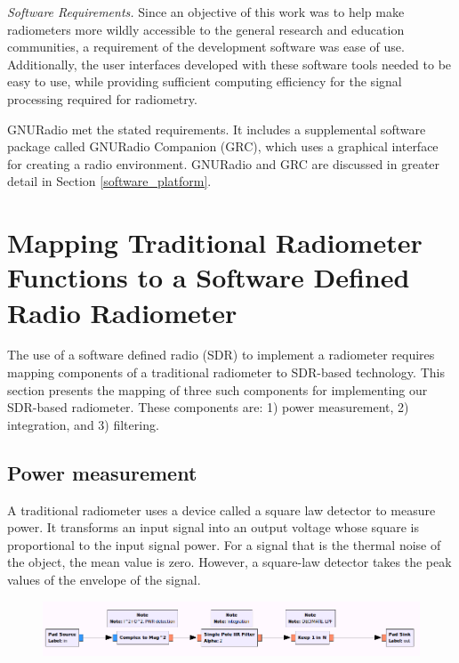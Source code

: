 \emph{Software Requirements.}  Since an objective of this work was to help make radiometers more wildly accessible to the general research and education communities, a requirement of the development software was ease of use.  Additionally, the user interfaces developed with these software tools needed to be easy to use, while providing sufficient computing efficiency for the signal processing required for radiometry.

GNURadio met the stated requirements.  It includes a supplemental software package called GNURadio Companion (GRC), which uses a graphical interface for creating a radio environment.  GNURadio and GRC are discussed in greater detail in Section \ref{software_platform}.


\section{Mapping Traditional Radiometer Functions to a Software Defined Radio Radiometer}

The use of a software defined radio (SDR) to implement a radiometer requires mapping components of a traditional radiometer to SDR-based technology.  This section presents the mapping of three such components for implementing our SDR-based radiometer.  These components are:  1) power measurement, 2) integration, and 3) filtering.

\subsection{Power measurement}

A traditional radiometer uses a device called a square law detector to measure power.  It transforms an input signal into an output voltage whose square is proportional to the input signal power.  For a signal that is the thermal noise of the object, the mean value is zero.  However, a square-law detector takes the peak values of the envelope of the signal.


{\begin{figure}[h!tb] 
\centering
\includegraphics[width=17cm]{Images/TPR_grc.png}
\label{square_block}
\end{figure}
}

